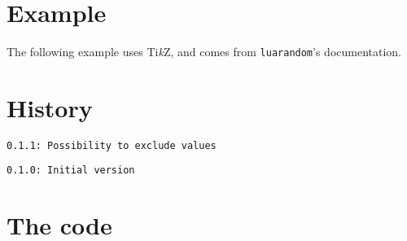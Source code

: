 \documentclass[11pt,a4paper]{ltxdoc}
\providecommand\tikzlogo{Ti\textit{k}Z}
\let\TikZ\tikzlogo
\begin{document}
\begin{DemoCode}{}
\ListeRandint[Min=5,Max=15,Nb=7,Repet,Tri=croiss,Sep={/}]{\maliste}\maliste\\
\end{DemoCode}

\pagebreak

\section{Example}

The following example uses \TikZ, and comes from \texttt{luarandom}'s documentation.

\begin{DemoCode}{}
\end{DemoCode}

\pagebreak

\section{History}

\texttt{0.1.1: Possibility to exclude values}

\texttt{0.1.0: Initial version}

\section{The code}

\end{document}

